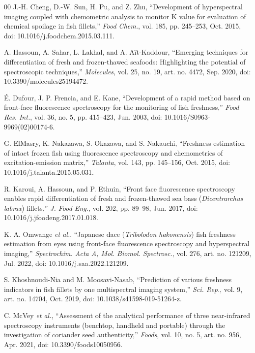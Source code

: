 \documentclass[conference]{IEEEtran}
\begin{document}
\begin{thebibliography}{00}
J.-H. Cheng, D.-W. Sun, H. Pu, and Z. Zhu, ``Development of hyperspectral imaging coupled with chemometric analysis to monitor K value for evaluation of chemical spoilage in fish fillets,'' \textit{Food Chem.}, vol. 185, pp. 245--253, Oct. 2015, doi: 10.1016/j.foodchem.2015.03.111.

A. Hassoun, A. Sahar, L. Lakhal, and A. A{\"i}t-Kaddour, ``Emerging techniques for differentiation of fresh and frozen-thawed seafoods: Highlighting the potential of spectroscopic techniques,'' \textit{Molecules}, vol. 25, no. 19, art. no. 4472, Sep. 2020, doi: 10.3390/molecules25194472.

{\'E}. Dufour, J. P. Frencia, and E. Kane, ``Development of a rapid method based on front-face fluorescence spectroscopy for the monitoring of fish freshness,'' \textit{Food Res. Int.}, vol. 36, no. 5, pp. 415--423, Jun. 2003, doi: 10.1016/S0963-9969(02)00174-6.

G. ElMasry, K. Nakazawa, S. Okazawa, and S. Nakauchi, ``Freshness estimation of intact frozen fish using fluorescence spectroscopy and chemometrics of excitation-emission matrix,'' \textit{Talanta}, vol. 143, pp. 145--156, Oct. 2015, doi: 10.1016/j.talanta.2015.05.031.

R. Karoui, A. Hassoun, and P. Ethuin, ``Front face fluorescence spectroscopy enables rapid differentiation of fresh and frozen-thawed sea bass (\textit{Dicentrarchus labrax}) fillets,'' \textit{J. Food Eng.}, vol. 202, pp. 89--98, Jun. 2017, doi: 10.1016/j.jfoodeng.2017.01.018.

K. A. Omwange \textit{et al.}, ``Japanese dace (\textit{Tribolodon hakonensis}) fish freshness estimation from eyes using front-face fluorescence spectroscopy and hyperspectral imaging,'' \textit{Spectrochim. Acta A, Mol. Biomol. Spectrosc.}, vol. 276, art. no. 121209, Jul. 2022, doi: 10.1016/j.saa.2022.121209.

S. Khoshnoudi-Nia and M. Moosavi-Nasab, ``Prediction of various freshness indicators in fish fillets by one multispectral imaging system,'' \textit{Sci. Rep.}, vol. 9, art. no. 14704, Oct. 2019, doi: 10.1038/s41598-019-51264-z.

C. McVey \textit{et al.}, ``Assessment of the analytical performance of three near-infrared spectroscopy instruments (benchtop, handheld and portable) through the investigation of coriander seed authenticity,'' \textit{Foods}, vol. 10, no. 5, art. no. 956, Apr. 2021, doi: 10.3390/foods10050956.


\end{thebibliography}
\end{document}
